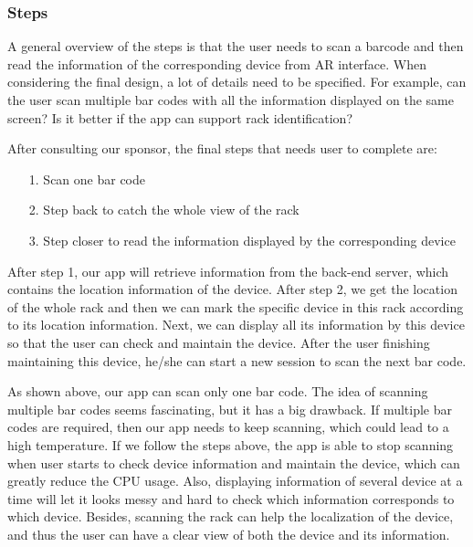 \documentclass[11pt,a4paper]{article}
\begin{document}
\begin{onehalfspace}
\subsubsection{Steps}
A general overview of the steps is that the user needs to scan a barcode and then read the information of the corresponding device from AR interface. When considering the final design, a lot of details need to be specified. For example, can the user scan multiple bar codes with all the information displayed on the same screen? Is it better if the app can support rack identification?

After consulting our sponsor, the final steps that needs user to complete are:
\begin{itemize}
\setlength{\itemsep}{0pt}
\setlength{\parsep}{0pt}
\setlength{\parskip}{0pt}
\setlength{\partopsep}{0pt}
\setlength{\topsep}{0pt}
    \item [1. ] Scan one bar code
    \item [2. ] Step back to catch the whole view of the rack
    \item [3. ] Step closer to read the information displayed by the corresponding device
\end{itemize}

After step 1, our app will retrieve information from the back-end server, which contains the location information of the device. After step 2, we get the location of the whole rack and then we can mark the specific device in this rack according to its location information. Next, we can display all its information by this device so that the user can check and maintain the device. After the user finishing maintaining this device, he/she can start a new session to scan the next bar code.

As shown above, our app can scan only one bar code. The idea of scanning multiple bar codes seems fascinating, but it has a big drawback. If multiple bar codes are required, then our app needs to keep scanning, which could lead to a high temperature. If we follow the steps above, the app is able to stop scanning when user starts to check device information and maintain the device, which can greatly reduce the CPU usage. Also, displaying information of several device at a time will let it looks messy and hard to check which information corresponds to which device. Besides, scanning the rack can help the localization of the device, and thus the user can have a clear view of both the device and its information.




\end{onehalfspace}
\end{document}
